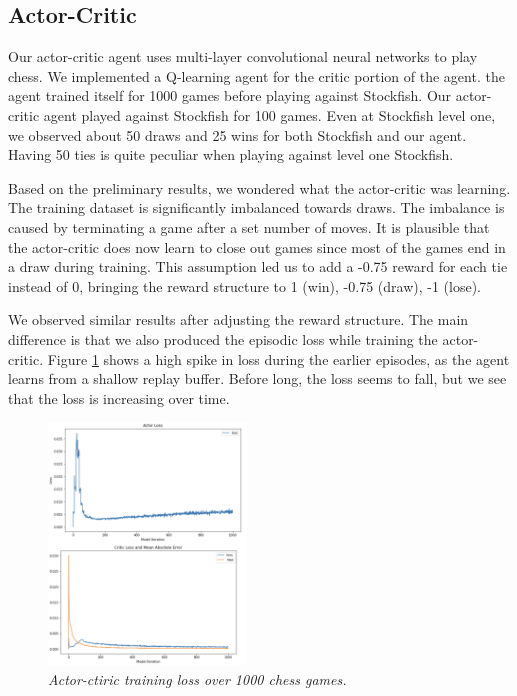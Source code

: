 \documentclass[12pt]{turabian-researchpaper}
\begin{document}
\subsection{Actor-Critic}
Our actor-critic agent uses multi-layer convolutional neural networks to play chess. We implemented a Q-learning agent for the critic portion of the agent. the agent trained itself for 1000 games before playing against Stockfish. Our actor-critic agent played against Stockfish for 100 games. Even at Stockfish level one, we observed about 50 draws and 25 wins for both Stockfish and our agent. Having 50 ties is quite peculiar when playing against level one Stockfish. 

Based on the preliminary results, we wondered what the actor-critic was learning. The training dataset is significantly imbalanced towards draws. The imbalance is caused by terminating a game after a set number of moves. It is plausible that the actor-critic does now learn to close out games since most of the games end in a draw during training. This assumption led us to add a -0.75 reward for each tie instead of 0, bringing the reward structure to 1 (win), -0.75 (draw), -1 (lose). 

We observed similar results after adjusting the reward structure. The main difference is that we also produced the episodic loss while training the actor-critic. Figure \ref{fig:ac_a_loss} shows a high spike in loss during the earlier episodes, as the agent learns from a shallow replay buffer. Before long, the loss seems to fall, but we see that the loss is increasing over time. 

\begin{figure}[!ht]
    \centering
    \includegraphics[width=0.47\textwidth]{ac_loss_1k.png}
    \caption{\textit{ Actor-ctiric training loss over 1000 chess games.}}
    \label{fig:ac_a_loss}
\end{figure}
\end{document}
